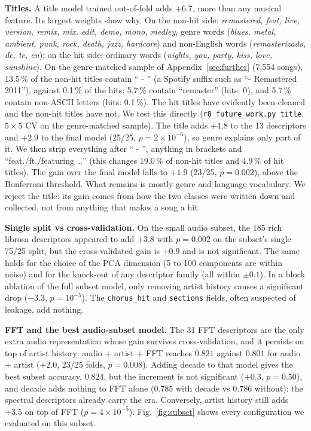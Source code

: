 \textbf{Titles.} A title model trained out-of-fold adds $+6.7$\pp, more than any musical
feature. Its largest weights show why. On the non-hit side: \emph{remastered, feat, live, version, remix, mix,
edit, demo, mono, medley}, genre words (\emph{blues, metal, ambient, punk, rock, death, jazz, hardcore}) and
non-English words (\emph{remasterizado, de, te, en}); on the hit side: ordinary words (\emph{nights, you, party,
kiss, love, sunshine}). On the genre-matched sample of Appendix~\ref{sec:further} (7{,}554 songs), 13.5\,\% of the
non-hit titles contain `` - '' (a Spotify suffix such as ``- Remastered 2011''), against 0.1\,\% of the hits;
5.7\,\% contain ``remaster'' (hits: 0), and 5.7\,\% contain non-ASCII letters (hits: 0.1\,\%). The hit titles have
evidently been cleaned and the non-hit titles have not. We test this directly (\texttt{r8\_future\_work.py title},
$5{\times}5$ CV on the genre-matched sample). The title adds $+4.8$\pp{} to the 13 descriptors and $+2.9$\pp{} to
the final model (25/25, $p=2\times10^{-6}$), so genre explains only part of it. We then strip everything after
`` - '', anything in brackets and ``feat./ft./featuring \dots'' (this changes 19.0\,\% of non-hit titles and 4.9\,\%
of hit titles). The gain over the final model falls to $+1.9$\pp{} (23/25, $p=0.002$), above the Bonferroni
threshold. What remains is mostly genre and language vocabulary. We reject the title: its gain comes from how the
two classes were written down and collected, not from anything that makes a song a hit.

\textbf{Single split vs cross-validation.} On the small audio subset, the 185 rich librosa
descriptors appeared to add $+3.8$\pp{} with $p=0.002$ on the subset's single 75/25 split, but the
cross-validated gain is $+0.9$\pp{} and is not significant. The same holds for the choice
of the PCA dimension (5 to 100 components are within noise) and for the knock-out of any
descriptor family (all within $\pm0.1$\pp). In a block ablation of the full subset model,
only removing artist history causes a significant drop ($-3.3$\pp, $p=10^{-5}$). The
\texttt{chorus\_hit} and \texttt{sections} fields, often suspected of leakage, add nothing.

\textbf{FFT and the best audio-subset model.} The 31 FFT descriptors are the only extra
audio representation whose gain survives cross-validation, and it persists on top of
artist history: audio + artist + FFT reaches $0.821$ against $0.801$ for audio + artist
($+2.0$\pp, 23/25 folds, $p=0.008$). Adding decade to that model gives the best subset
accuracy, $0.824$, but the increment is not significant ($+0.3$\pp, $p=0.50$), and
decade adds nothing to FFT alone ($0.785$ with decade vs $0.786$ without): the spectral descriptors already
carry the era. Conversely, artist history still adds $+3.5$\pp{} on top of FFT
($p=4\times10^{-5}$). Fig.~\ref{fig:subset} shows every configuration we evaluated on
this subset.

